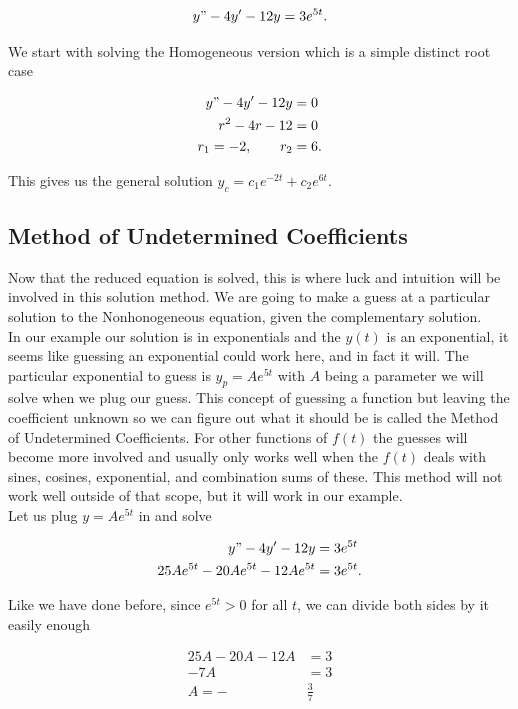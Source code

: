\documentclass[12pt]{article}
\begin{document}
\begin{equation*}
    y"-4y'-12y = 3e^{5t}.
\end{equation*}

We start with solving the Homogeneous version which is a simple distinct root case

\begin{align*}
    y"-4y'-12y &= 0 \\
    r^2-4r-12 &= 0 \\
    r_1 = -2, \qquad r_2 &= 6.
\end{align*}

This gives us the general solution $y_c=c_1e^{-2t} + c_2e^{6t}$. 

\subsection{Method of Undetermined Coefficients}

Now that the reduced equation is solved, this is where luck and intuition will be involved in this solution method. We are going to make a guess at a particular solution to the Nonhonogeneous equation, given the complementary solution. \\

In our example our solution is in exponentials and the $y(t)$ is an exponential, it seems like guessing an exponential could work here, and in fact it will. The particular exponential to guess is $y_p=Ae^{5t}$ with $A$ being a parameter we will solve when we plug our guess. This concept of guessing a function but leaving the coefficient unknown so we can figure out what it should be is called the Method of Undetermined Coefficients. For other functions of $f(t)$ the guesses will become more involved and usually only works well when the $f(t)$ deals with sines, cosines, exponential, and combination sums of these. This method will not work well outside of that scope, but it will work in our example. \\

Let us plug $y=Ae^{5t}$ in and solve

\begin{align*}
    y"-4y'-12y &= 3e^{5t} \\
    25Ae^{5t}-20Ae^{5t}-12Ae^{5t} &= 3e^{5t}.
\end{align*}

Like we have done before, since $e^{5t}>0$ for all $t$, we can divide both sides by it easily enough

\begin{align*}
    25A-20A-12A &= 3 \\
    -7A &= 3 \\
    A = -&\frac{3}{7}
\end{align*}
\end{document}
